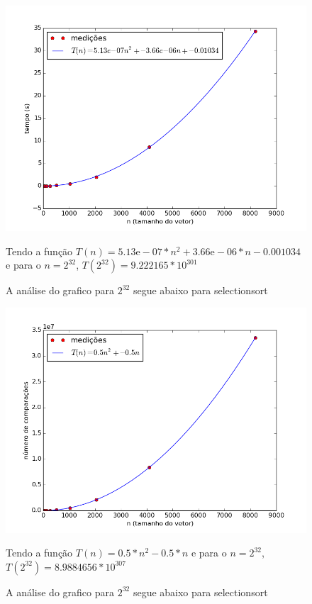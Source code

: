 \documentclass[12pt,a4paper,twoside]{report}
\begin{document}


\begin{figure}[ht]
\centering \includegraphics[scale=0.8]{../selectionsort/imagens/selectionsortCrescente0.png}
\caption{A análise do grafico para $2^{32}$ segue abaixo para selectionsort}

Tendo a função $T(n) = 5.13\mathrm{e}-07*n^{2}+3.66\mathrm{e}-06*n-0.001034$ e para o $n =2^{32}$, $T(2^{32}) = 9.222165 * 10^{301}$
\label{fig:selectionsortCrescente0}
\end{figure}

\begin{figure}[ht]
\centering \includegraphics[scale=0.8]{../selectionsort/imagens/selectionsortCrescente1.png}
\caption{A análise do grafico para $2^{32}$ segue abaixo para selectionsort}

Tendo a função $T(n) = 0.5*n^{2}-0.5*n$ e para o $n =2^{32}$, $T(2^{32}) =8.9884656 * 10^{307}$
\label{fig:selectionsortCrescente1}
\end{figure}
\end{document}
